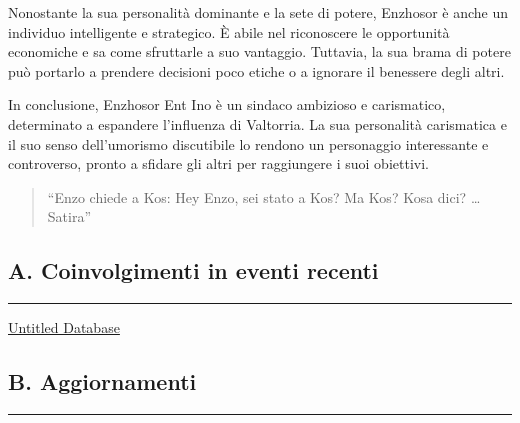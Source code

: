Nonostante la sua personalità dominante e la sete di potere, Enzhosor è
anche un individuo intelligente e strategico. È abile nel riconoscere le
opportunità economiche e sa come sfruttarle a suo vantaggio. Tuttavia,
la sua brama di potere può portarlo a prendere decisioni poco etiche o a
ignorare il benessere degli altri.

In conclusione, Enzhosor Ent Ino è un sindaco ambizioso e carismatico,
determinato a espandere l'influenza di Valtorria. La sua personalità
carismatica e il suo senso dell'umorismo discutibile lo rendono un
personaggio interessante e controverso, pronto a sfidare gli altri per
raggiungere i suoi obiettivi.

\begin{quote}
``Enzo chiede a Kos: Hey Enzo, sei stato a Kos? Ma Kos? Kosa dici?
\ldots{} Satira''
\end{quote}

\subsection{A. Coinvolgimenti in eventi
recenti}\label{a.-coinvolgimenti-in-eventi-recenti}

\begin{center}\rule{0.5\linewidth}{0.5pt}\end{center}

\href{Untitled\%20Database\%20b540a0577b624713b0d8ac194cd482f5.csv}{Untitled
Database}

\subsection{B. Aggiornamenti}\label{b.-aggiornamenti}

\begin{center}\rule{0.5\linewidth}{0.5pt}\end{center}

\href{Untitled\%205bbba70bc8d14d398e68283ff572fd85.csv}{}
